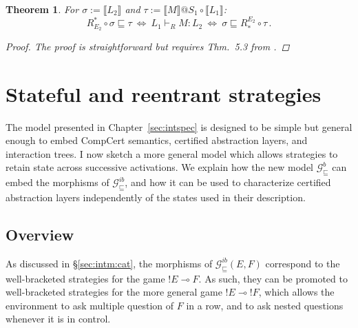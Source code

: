 \documentclass[11pt,oneside,draft]{book}
\newtheorem{theorem}{Theorem}[chapter]
\newtheorem{lemma}[theorem]{Lemma}
\theoremstyle{definition}
\newcommand{\gcat}{\mathcal{G}_{\sqsubseteq}}
\begin{document}

\begin{theorem}
For
$\sigma := \llbracket L_2 \rrbracket$ and
$\tau := \llbracket M \rrbracket @ S_1 \circ \llbracket L_1 \rrbracket$:
\[
  R^*_{E_2} \!\circ \sigma \sqsubseteq \tau
  \: \Leftrightarrow \:
  L_1 \vdash_R M : L_2
  \: \Leftrightarrow \:
  \sigma \sqsubseteq R_*^{E_2} \!\circ \tau \,.
\]
\begin{proof}
The proof is straightforward but requires
Thm.~5.3 from \citet{dndf}.
\end{proof}
\end{theorem}




\chapter{Stateful and reentrant strategies} \label{sec:gamesem} %

The model presented in Chapter~\ref{sec:intspec}
is designed to be simple but
general enough to embed CompCert semantics, certified
abstraction layers, and interaction trees.
I now sketch a more general model
which allows strategies to retain state
across successive activations.
We explain how the new model $\gcat^b$ can embed
the morphisms of $\gcat^{ib}$,
and how it can be used to characterize
certified abstraction layers
independently of the states used in their description.

\section{Overview} %
\label{sec:arrow}

As discussed in \S\ref{sec:intm:cat},
the morphisms of $\gcat^{ib}(E, F)$
correspond to the well-bracketed strategies
for the game ${!E} \multimap F$.
As such, they can be promoted to well-bracketed strategies for
the more general game ${!E} \multimap {!F}$,
which allows the environment to ask
multiple question of $F$ in a row,
and to ask nested questions
whenever it is in control.
\end{document}
